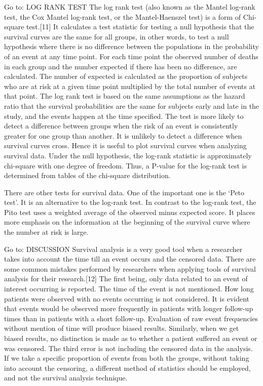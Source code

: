 Go to:
LOG RANK TEST
The log rank test (also known as the Mantel log-rank test, the Cox Mantel log-rank test, or the Mantel-Haenszel test) is a form of Chi-square test.[11] It calculates a test statistic for testing a null hypothesis that the survival curves are the same for all groups, in other words, to test a null hypothesis where there is no difference between the populations in the probability of an event at any time point. For each time point the observed number of deaths in each group and the number expected if there has been no difference, are calculated. The number of expected is calculated as the proportion of subjects who are at risk at a given time point multiplied by the total number of events at that point. The log rank test is based on the same assumptions as the hazard ratio that the survival probabilities are the same for subjects early and late in the study, and the events happen at the time specified. The test is more likely to detect a difference between groups when the risk of an event is consistently greater for one group than another. It is unlikely to detect a difference when survival curves cross. Hence it is useful to plot survival curves when analyzing survival data. Under the null hypothesis, the log-rank statistic is approximately chi-square with one degree of freedom. Thus, a P-value for the log-rank test is determined from tables of the chi-square distribution.

There are other tests for survival data. One of the important one is the ‘Peto test’. It is an alternative to the log-rank test. In contrast to the log-rank test, the Pito test uses a weighted average of the observed minus expected score. It places more emphasis on the information at the beginning of the survival curve where the number at risk is large.

Go to:
DISCUSSION
Survival analysis is a very good tool when a researcher takes into account the time till an event occurs and the censored data. There are some common mistakes performed by researchers when applying tools of survival analysis for their research.[12] The first being, only data related to an event of interest occurring is reported. The time of the event is not mentioned. How long patients were observed with no events occurring is not considered. It is evident that events would be observed more frequently in patients with longer follow-up times than in patients with a short follow-up. Evaluation of raw event frequencies without mention of time will produce biased results. Similarly, when we get biased results, no distinction is made as to whether a patient suffered an event or was censored. The third error is not including the censored data in the analysis. If we take a specific proportion of events from both the groups, without taking into account the censoring, a different method of statistics should be employed, and not the survival analysis technique.

